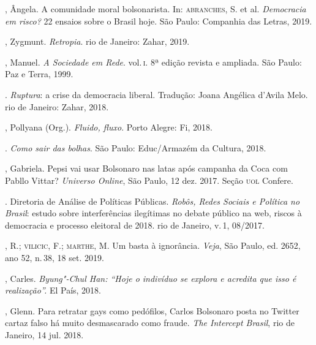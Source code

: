 \begin{bibliohedra}
, Ângela. A comunidade moral bolsonarista. In: \textsc{abranches}, S. et
al. \textit{Democracia em risco?} 22 ensaios sobre o Brasil hoje. São
Paulo: Companhia das Letras, 2019.

, Zygmunt. \textit{Retropia}. rio de Janeiro: Zahar, 2019.

, Manuel. \textit{A Sociedade em Rede}. vol.\,\textsc{i}. 8ª edição
revista e ampliada. São Paulo: Paz e Terra, 1999.

\titidem. \textit{Ruptura}: a crise da democracia liberal.
Tradução: Joana Angélica d'Avila Melo. rio de Janeiro: Zahar, 2018.

, Pollyana (Org.). \textit{Fluido, fluxo}. Porto Alegre: Fi, 2018.

\titidem. \textit{Como sair das bolhas}. São Paulo: Educ/Armazém
da Cultura, 2018.

, Gabriela. Pepsi vai usar Bolsonaro nas latas após campanha da
Coca com Pabllo Vittar? \textit{Universo Online}, São Paulo, 12 dez. 2017.
Seção \textsc{uol} Confere. 

. Diretoria de Análise de Políticas Públicas.
\textit{Robôs, Redes Sociais e Política no Brasil}: estudo sobre
interferências ilegítimas no debate público na web, riscos à democracia
e processo eleitoral de 2018. rio de Janeiro, v.\,1, 08/2017.

, R.; \textsc{vilicic}, F.; \textsc{marthe}, M. Um basta à ignorância. \textit{Veja},
São Paulo, ed. 2652, ano 52, n.\,38, 18 set. 2019.

, Carles. \textit{Byung"-Chul Han: ``Hoje o indivíduo se explora e
acredita que isso é realização''.} El País, 2018. 

, Glenn. Para retratar gays como pedófilos, Carlos Bolsonaro
posta no Twitter cartaz falso há muito desmascarado como fraude.
\textit{The Intercept Brasil}, rio de Janeiro, 14 jul. 2018. 


\end{bibliohedra}
